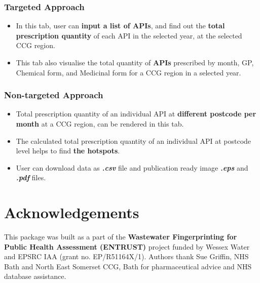 \documentclass[
]{book}
\providecommand{\tightlist}{%
  \setlength{\itemsep}{0pt}\setlength{\parskip}{0pt}}
\begin{document}
\hypertarget{targeted-approach}{%
\subsection{Targeted Approach}\label{targeted-approach}}

\begin{itemize}
\tightlist
\item
  In this tab, user can \textbf{input a list of APIs}, and find out the \textbf{total prescription quantity} of each API in the selected year, at the selected CCG region.
\item
  This tab also visualise the total quantity of \textbf{APIs} prescribed by month, GP, Chemical form, and Medicinal form for a CCG region in a selected year.
\end{itemize}

\hypertarget{non-targeted-approach}{%
\subsection{Non-targeted Approach}\label{non-targeted-approach}}

\begin{itemize}
\tightlist
\item
  Total prescription quantity of an individual API at \textbf{different postcode per month} at a CCG region, can be rendered in this tab.
\item
  The calculated total prescription quantity of an individual API at postcode level helps to find \textbf{the hotspots}.
\item
  User can download data as \textbf{\emph{.csv}} file and publication ready image \textbf{\emph{.eps}} and \textbf{\emph{.pdf}} files.
\end{itemize}

\hypertarget{acknowledgements}{%
\chapter{Acknowledgements}\label{acknowledgements}}

This package was built as a part of the \textbf{Wastewater Fingerprinting for Public Health Assessment (ENTRUST)} project funded by Wessex Water and EPSRC IAA (grant no. EP/R51164X/1). Authors thank Sue Griffin, NHS Bath and North East Somerset CCG, Bath for pharmaceutical advice and NHS database assistance.

  
\end{document}

